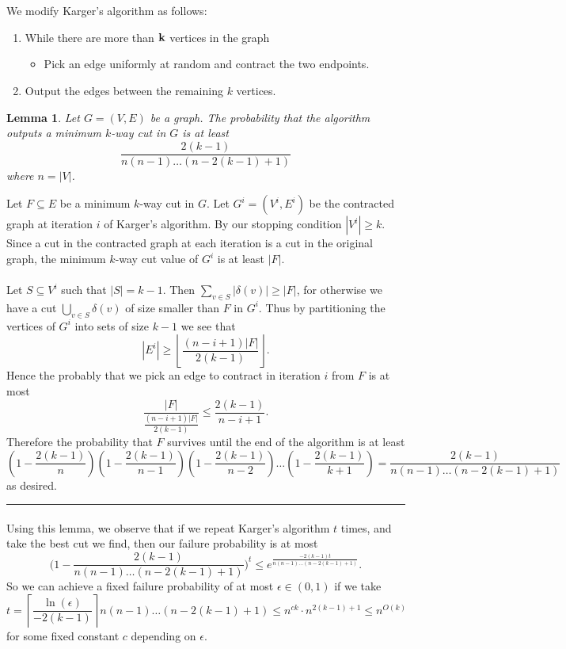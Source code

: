 \documentclass[letterpaper,12pt,oneside,onecolumn]{article}
\newenvironment{proof}{{\bf Proof:  }}{\hfill\rule{2mm}{2mm}}
\newtheorem{lemma}[fact]{Lemma}
\newcommand{\ceil}[1]{\ensuremath{\left\lceil#1\right\rceil}}
\newcommand{\floor}[1]{\ensuremath{\left\lfloor#1\right\rfloor}}
\begin{document}
\section{}
\paragraph{}
We modify Karger's algorithm as follows:
\begin{enumerate}
	\item While there are more than $\bf{k}$ vertices in the graph
	\begin{itemize}
		\item Pick an edge uniformly at random and contract the two endpoints.
	\end{itemize}
	\item Output the edges between the remaining $k$ vertices.
\end{enumerate}
\begin{lemma}
	Let $G=(V,E)$ be a graph. The probability that the algorithm outputs a minimum $k$-way cut in $G$ is at least $$\frac{2(k-1)}{n(n-1)\dots(n-2(k-1)+1)}$$ where $n = |V|$.
\end{lemma}
\begin{proof}
	Let $F\subseteq E$ be a minimum $k$-way cut in $G$. Let $G^i=(V^i,E^i)$ be the contracted graph at iteration $i$ of Karger's algorithm. By our stopping condition $|V^i| \geq k$. Since a cut in the contracted graph at each iteration is a cut in the original graph, the minimum $k$-way cut value of $G^i$ is at least $|F|$.
	\paragraph{}
	Let $S\subseteq V^i$ such that $|S|=k-1$. Then $\sum_{v \in S} |\delta(v)| \geq |F|$, for otherwise we have a cut $\bigcup_{v\in S} \delta(v)$ of size smaller than $F$ in $G^i$. Thus by partitioning the vertices of $G^i$ into sets of size $k-1$ we see that
	$$|E^i| \geq \floor{\frac{(n-i+1)|F|}{2(k-1)}}.$$
	Hence the probably that we pick an edge to contract in iteration $i$ from $F$ is at most
	$$ \frac{|F|}{\frac{(n-i+1)|F|}{2(k-1)}} \leq \frac{2(k-1)}{n-i+1}.$$
	Therefore the probability that $F$ survives until the end of the algorithm is at least
	$$(1-\frac{2(k-1)}{n})(1-\frac{2(k-1)}{n-1})(1-\frac{2(k-1)}{n-2})\dots(1-\frac{2(k-1)}{k+1}) = \frac{2(k-1)}{n(n-1)\dots(n-2(k-1)+1)}$$
	as desired.
\end{proof}
\paragraph{}
Using this lemma, we observe that if we repeat Karger's algorithm $t$ times, and take the best cut we find, then our failure probability is at most 
$$\big(1 -  \frac{2(k-1)}{n(n-1)\dots(n-2(k-1)+1)}\big)^t \leq e^\frac{-2(k-1)t}{n(n-1)\dots(n-2(k-1)+1)}.$$
So we can achieve a fixed failure probability of at most $\epsilon \in (0,1)$ if we take 
$$t = \ceil{\frac{\ln(\epsilon)}{-2(k-1)}}n(n-1)\dots(n-2(k-1)+1) \leq n^{ck}\cdot n^{2(k-1)+1} \leq n^{O(k)}$$
for some fixed constant $c$ depending on $\epsilon$.
\end{document}
